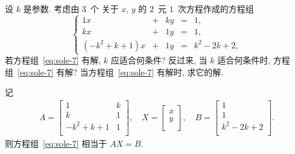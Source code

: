 \documentclass[../libro.tex]{subfiles}
\begin{document}
\begin{example}
    设 \(k\) 是参数.
    考虑由 \(3\)~个%
    关于 \(x\), \(y\) 的
    \(2\)~元 \(1\)~次方程作成的方程组
    \begin{equation}
        \left\{ %
        \begin{alignedat}{4}
            1 x              & {} + {} & k y & {} = {} & 1, \\
            k x              & {} + {} & 1 y & {} = {} & 1, \\
            (-k^2 + k + 1) x & {} + {} & 1 y & {} = {} & k^2 - 2 k + 2,
        \end{alignedat}
        \right. %
        \label{eq:sole-7}
    \end{equation}
    若方程组~\eqref{eq:sole-7} 有解,
    \(k\) 应适合何条件?
    反过来, 当 \(k\) 适合何条件时,
    方程组~\eqref{eq:sole-7} 有解?
    当方程组~\eqref{eq:sole-7} 有解时,
    求它的解.

    记
    \begin{align*}
        A =
        \begin{bmatrix}
            1        & k \\
            k        & 1 \\
            -k^2+k+1 & 1 \\
        \end{bmatrix},
        \quad
        X =
        \begin{bmatrix}
            x \\
            y \\
        \end{bmatrix},
        \quad
        B =
        \begin{bmatrix}
            1        \\
            1        \\
            k^2-2k+2 \\
        \end{bmatrix}.
    \end{align*}
    则方程组~\eqref{eq:sole-7} 相当于 \(A X = B\).


\end{example}
\end{document}
